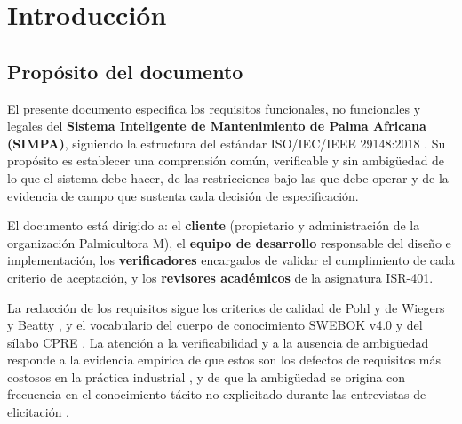 \documentclass[11pt,a4paper]{article}
\begin{document}
\vspace{0.4cm}
\noindent{}

\newpage
\tableofcontents
\newpage
\listoffigures
\listoftables
\newpage

\section{Introducción}

\subsection{Propósito del documento}

El presente documento especifica los requisitos funcionales, no funcionales y legales del
\textbf{Sistema Inteligente de Mantenimiento de Palma Africana (SIMPA)}, siguiendo la estructura
del estándar ISO/IEC/IEEE 29148:2018 \cite{iso29148}. Su propósito es establecer una comprensión
común, verificable y sin ambigüedad de lo que el sistema debe hacer, de las restricciones bajo las
que debe operar y de la evidencia de campo que sustenta cada decisión de especificación.

El documento está dirigido a: el \textbf{cliente} (propietario y administración de la organización
Palmicultora M), el \textbf{equipo de desarrollo} responsable del diseño e implementación, los
\textbf{verificadores} encargados de validar el cumplimiento de cada criterio de aceptación, y los
\textbf{revisores académicos} de la asignatura ISR-401.

La redacción de los requisitos sigue los criterios de calidad de Pohl \cite{pohl2010} y de Wiegers y
Beatty \cite{wiegers2013}, y el vocabulario del cuerpo de conocimiento SWEBOK v4.0 \cite{swebok4} y
del sílabo CPRE \cite{ireb2023}. La atención a la verificabilidad y a la ausencia de ambigüedad
responde a la evidencia empírica de que estos son los defectos de requisitos más costosos en la
práctica industrial \cite{mendez2017,montgomery2022}, y de que la ambigüedad se origina con
frecuencia en el conocimiento tácito no explicitado durante las entrevistas de elicitación
\cite{ferrari2016}.
\end{document}
